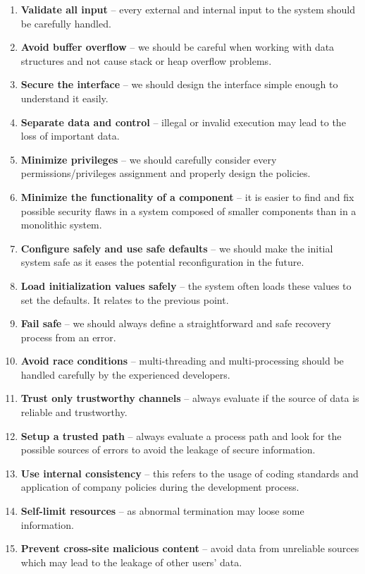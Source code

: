 \documentclass[12pt,a4,twoside]{article}
\begin{document}
\begin{enumerate}
    \item \textbf{Validate all input} -- every external and internal input to the system should be carefully handled.
    \item \textbf{Avoid buffer overflow} -- we should be careful when working with data structures and not cause stack or heap overflow problems.
    \item \textbf{Secure the interface} -- we should design the interface simple enough to understand it easily.
    \item \textbf{Separate data and control} -- illegal or invalid execution may lead to the loss of important data.
    \item \textbf{Minimize privileges} -- we should carefully consider every permissions/privileges assignment and properly design the policies.
    \item \textbf{Minimize the functionality of a component} -- it is easier to find and fix possible security flaws in a system composed of smaller components than in a monolithic system.
    \item \textbf{Configure safely and use safe defaults} -- we should make the initial system safe as it eases the potential reconfiguration in the future.
    \item \textbf{Load initialization values safely} -- the system often loads these values to set the defaults. It relates to the previous point.
    \item \textbf{Fail safe} -- we should always define a straightforward and safe recovery process from an error.
    \item \textbf{Avoid race conditions} -- multi-threading and multi-processing should be handled carefully by the experienced developers.
    \item \textbf{Trust only trustworthy channels} -- always evaluate if the source of data is reliable and trustworthy.
    \item \textbf{Setup a trusted path} -- always evaluate a process path and look for the possible sources of errors to avoid the leakage of secure information.
    \item \textbf{Use internal consistency} -- this refers to the usage of coding standards and application of company policies during the development process.
    \item \textbf{Self-limit resources} -- as abnormal termination may loose some information.
    \item \textbf{Prevent cross-site malicious content} -- avoid data from unreliable sources which may lead to the leakage of other users' data.

\end{enumerate}
\end{document}
